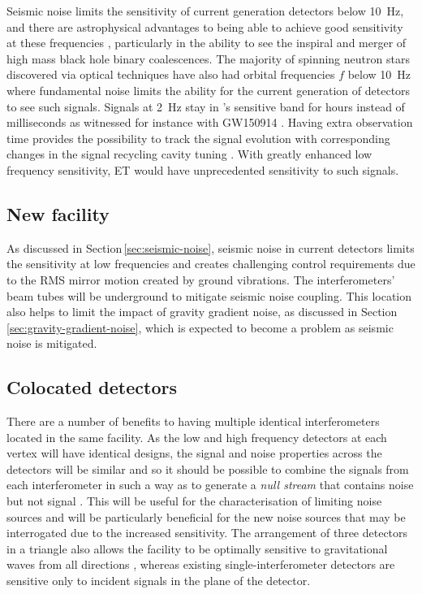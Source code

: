 Seismic noise limits the sensitivity of current generation detectors below \SI{10}{\hertz}, and there are astrophysical advantages to being able to achieve good sensitivity at these frequencies \cite{Sathyaprakash2012}, particularly in the ability to see the inspiral and merger of high mass black hole binary coalescences. The majority of spinning neutron stars discovered via optical techniques have also had orbital frequencies $f$ below \SI{10}{\hertz} where fundamental noise limits the ability for the current generation of detectors to see such signals. Signals at \SI{2}{\hertz} stay in \ETLF{}'s sensitive band for hours instead of milliseconds as witnessed for instance with GW150914 \cite{ET2011} . Having extra observation time provides the possibility to track the signal evolution with corresponding changes in the signal recycling cavity tuning \cite{Heinzel2002, Simakov2014}. With greatly enhanced low frequency sensitivity, \gls{ET} would have unprecedented sensitivity to such signals.

\subsection{New facility}
As discussed in Section\,\ref{sec:seismic-noise}, seismic noise in current detectors limits the sensitivity at low frequencies and creates challenging control requirements due to the \gls{RMS} mirror motion created by ground vibrations. The \ET{} interferometers' beam tubes will be underground  to mitigate seismic noise coupling. This location also helps to limit the impact of gravity gradient noise, as discussed in Section\,\ref{sec:gravity-gradient-noise}, which is expected to become a problem as seismic noise is mitigated.

\subsection{Colocated detectors}
There are a number of benefits to having multiple identical interferometers located in the same facility. As the low and high frequency detectors at each vertex will have identical designs, the signal and noise properties across the detectors will be similar and so it should be possible to combine the signals from each interferometer in such a way as to generate a \emph{null stream} that contains noise but not signal \cite{Hewitson2005, Ajith2006}. This will be useful for the characterisation of limiting noise sources and will be particularly beneficial for the new noise sources that may be interrogated due to the increased sensitivity. The arrangement of three detectors in a triangle also allows the facility to be optimally sensitive to gravitational waves from all directions \cite{Winkler1985}, whereas existing single-interferometer detectors are sensitive only to incident signals in the plane of the detector.

